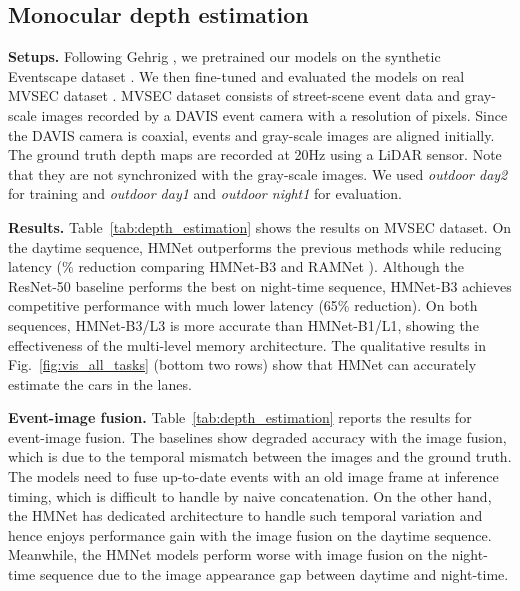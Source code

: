 \subsection{Monocular depth estimation}
\label{sec:depth_estimation}

\noindent
\textbf{Setups.}
Following Gehrig \etal \cite{Gehrig2021}, we pretrained our models on the synthetic Eventscape dataset \cite{Gehrig2021}. We then fine-tuned and evaluated the models on real MVSEC dataset \cite{Zhu2018MVSEC}. MVSEC dataset consists of street-scene event data and gray-scale images recorded by a DAVIS event camera with a resolution of  pixels. Since the DAVIS camera is coaxial, events and gray-scale images are aligned initially.
The ground truth depth maps are recorded at 20Hz using a LiDAR sensor.
Note that they are not synchronized with the gray-scale images.
We used {\it outdoor day2} for training and {\it outdoor day1} and {\it outdoor night1} for evaluation.

\tbDepthEstimation

\vspace{0.1cm}
\noindent
\textbf{Results.}
Table~\ref{tab:depth_estimation} shows the results on MVSEC dataset.
On the daytime sequence, HMNet outperforms the previous methods while reducing latency (\% reduction comparing HMNet-B3 and RAMNet \cite{Gehrig2021}).
Although the ResNet-50 baseline performs the best on night-time sequence, HMNet-B3 achieves competitive performance with much lower latency (65\% reduction).
On both sequences, HMNet-B3/L3 is more accurate than HMNet-B1/L1, showing the effectiveness of the multi-level memory architecture.
The qualitative results in Fig.~\ref{fig:vis_all_tasks} (bottom two rows) show that HMNet can accurately estimate the cars in the lanes.

\vspace{0.1cm}
\noindent
\textbf{Event-image fusion.}
Table~\ref{tab:depth_estimation} reports the results for event-image fusion.
The baselines show degraded accuracy with the image fusion, which is due to the temporal mismatch between the images and the ground truth.
The models need to fuse up-to-date events with an old image frame at inference timing, which is difficult to handle by naive concatenation.
On the other hand, the HMNet has dedicated architecture to handle such temporal variation and hence enjoys performance gain with the image fusion on the daytime sequence.
Meanwhile, the HMNet models perform worse with image fusion on the night-time sequence due to the image appearance gap between daytime and night-time.

